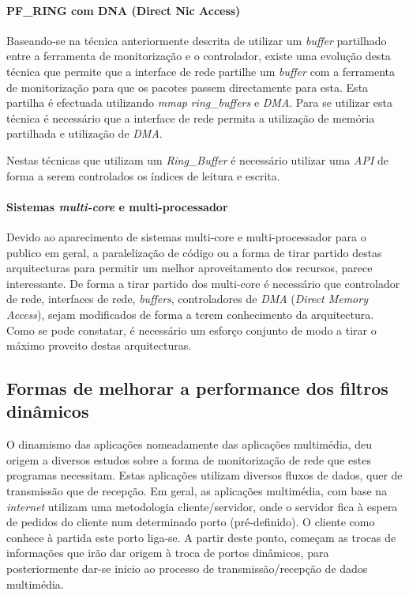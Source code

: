 \paragraph*{PF\_RING com DNA (Direct Nic Access)}
Baseando-se na técnica anteriormente descrita de utilizar um \textit{buffer} partilhado entre a ferramenta de monitorização e o controlador, existe uma evolução desta técnica que permite que a interface de rede partilhe um \textit{buffer} com a ferramenta de monitorização para que os pacotes passem directamente para esta. Esta partilha é efectuada utilizando \textit{mmap} \textit{ring\_buffers} e \textit{DMA}. Para se utilizar esta técnica é necessário que a interface de rede permita a utilização de memória partilhada e utilização de \textit{DMA}.

Nestas técnicas que utilizam um \textit{Ring\_Buffer} é necessário utilizar uma \textit{API} de forma a serem controlados os índices de leitura e escrita\cite{:IntroPF_RIDNADirecNICAcces}.

\paragraph*{Sistemas \textit{multi-core} e multi-processador}
Devido ao aparecimento de sistemas multi-core e multi-processador para o publico em geral, a paralelização de código ou a forma de tirar partido destas arquitecturas para permitir um melhor aproveitamento dos recursos, parece interessante. 
De forma a tirar partido dos multi-core é necessário que controlador de rede, interfaces de rede, \textit{buffers}, controladores de \textit{DMA} (\textit{Direct Memory Access}), sejam modificados de forma a terem conhecimento da arquitectura. Como se pode constatar, é necessário um esforço conjunto de modo a tirar o máximo proveito destas arquitecturas\cite{Deri:2010}.




\subsection{Formas de melhorar a performance dos filtros dinâmicos}
 O dinamismo das aplicações nomeadamente das aplicações multimédia, deu origem a diversos estudos sobre a forma de monitorização de rede que estes programas necessitam.
Estas aplicações utilizam diversos fluxos de dados, quer de transmissão que de recepção. Em geral, as aplicações multimédia, com base na \textit{internet} utilizam uma metodologia cliente/servidor, onde o servidor fica à espera de pedidos do cliente num determinado porto (pré-definido). O cliente como conhece à partida este porto liga-se. A partir deste ponto, começam as trocas de informações que irão dar origem à troca de portos dinâmicos, para posteriormente dar-se inicio ao processo de transmissão/recepção de dados multimédia.

